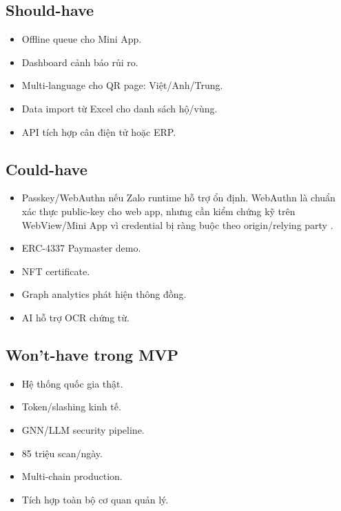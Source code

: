 \documentclass[12pt,a4paper]{article}
\begin{document}
\subsection{Should-have}

\begin{itemize}[leftmargin=2em]
    \item Offline queue cho Mini App.
    \item Dashboard cảnh báo rủi ro.
    \item Multi-language cho QR page: Việt/Anh/Trung.
    \item Data import từ Excel cho danh sách hộ/vùng.
    \item API tích hợp cân điện tử hoặc ERP.
\end{itemize}

\subsection{Could-have}

\begin{itemize}[leftmargin=2em]
    \item Passkey/WebAuthn nếu Zalo runtime hỗ trợ ổn định. WebAuthn là chuẩn xác thực public-key cho web app, nhưng cần kiểm chứng kỹ trên WebView/Mini App vì credential bị ràng buộc theo origin/relying party \cite{webauthn}.
    \item ERC-4337 Paymaster demo.
    \item NFT certificate.
    \item Graph analytics phát hiện thông đồng.
    \item AI hỗ trợ OCR chứng từ.
\end{itemize}

\subsection{Won't-have trong MVP}

\begin{itemize}[leftmargin=2em]
    \item Hệ thống quốc gia thật.
    \item Token/slashing kinh tế.
    \item GNN/LLM security pipeline.
    \item 85 triệu scan/ngày.
    \item Multi-chain production.
    \item Tích hợp toàn bộ cơ quan quản lý.
\end{itemize}
\end{document}

